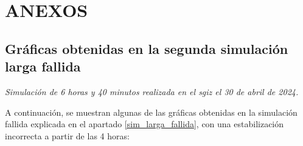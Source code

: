 
\newpage
\section*{ANEXOS} \label{sec:anexos} %

\renewcommand{\thesubsection}{\Alph{subsection}} %
\renewcommand{\thetable}{\Alph{subsection}.\arabic{table}}
\renewcommand{\thefigure}{\Alph{subsection}.\arabic{figure}}
\renewcommand{\thecode}{\Alph{subsection}.\arabic{code}}

\setcounter{subsection}{0}
\setcounter{table}{0}
\setcounter{figure}{0}

\subsection{Gráficas obtenidas en la segunda simulación larga fallida} \label{graficas_erroneas}

\textit{Simulación de 6 horas y 40 minutos realizada en el \acrshort{sgiz} el 30 de abril de 2024.}

A continuación, se muestran algunas de las gráficas obtenidas en la simulación fallida explicada en el apartado \ref{sim_larga_fallida}, con una estabilización incorrecta a partir de las 4 horas:

